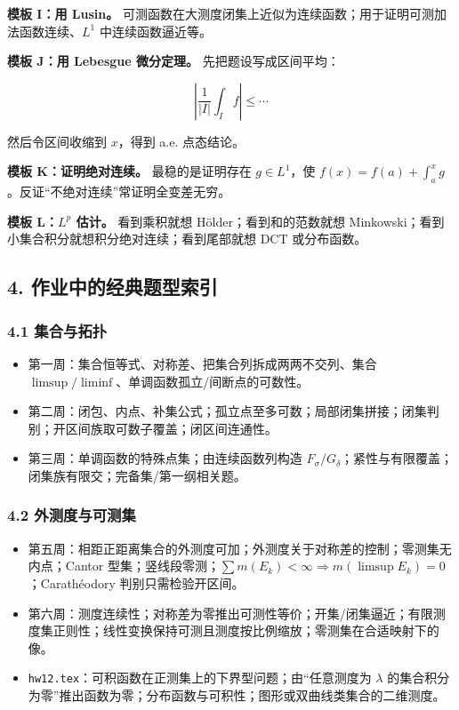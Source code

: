\documentclass[
UTF8]{ctexart}
\providecommand{\tightlist}{%
\setlength{\itemsep}{0pt}\setlength{\parskip}{0pt}}
\begin{document}
\textbf{模板 I：用 Lusin。}
可测函数在大测度闭集上近似为连续函数；用于证明可测加法函数连续、\(L^1\)
中连续函数逼近等。

\textbf{模板 J：用 Lebesgue 微分定理。} 先把题设写成区间平均：

\[
  \left|\frac1{|I|}\int_I f\right|\le \cdots
\]

然后令区间收缩到 \(x\)，得到 a.e. 点态结论。

\textbf{模板 K：证明绝对连续。} 最稳的是证明存在 \(g\in L^1\)，使
\(f(x)=f(a)+\int_a^x g\)。反证``不绝对连续''常证明全变差无穷。

\textbf{模板 L：\(L^p\) 估计。} 看到乘积就想 Hölder；看到和的范数就想
Minkowski；看到小集合积分就想积分绝对连续；看到尾部就想 DCT 或分布函数。

\subsection{4.
作业中的经典题型索引}\label{ux4f5cux4e1aux4e2dux7684ux7ecfux5178ux9898ux578bux7d22ux5f15}

\subsubsection{4.1 集合与拓扑}\label{ux96c6ux5408ux4e0eux62d3ux6251}

\begin{itemize}
    \tightlist
  \item
    第一周：集合恒等式、对称差、把集合列拆成两两不交列、集合
    \(\limsup/\liminf\)、单调函数孤立/间断点的可数性。
  \item
    第二周：闭包、内点、补集公式；孤立点至多可数；局部闭集拼接；闭集判别；开区间族取可数子覆盖；闭区间连通性。
  \item
    第三周：单调函数的特殊点集；由连续函数列构造
    \(F_\sigma/G_\delta\)；紧性与有限覆盖；闭集族有限交；完备集/第一纲相关题。
\end{itemize}

\subsubsection{4.2
外测度与可测集}\label{ux5916ux6d4bux5ea6ux4e0eux53efux6d4bux96c6}

\begin{itemize}
    \tightlist
  \item
    第五周：相距正距离集合的外测度可加；外测度关于对称差的控制；零测集无内点；Cantor
    型集；竖线段零测；\(\sum m(E_k)<\infty\Rightarrow m(\limsup E_k)=0\)；Carathéodory
    判别只需检验开区间。
  \item
    第六周：测度连续性；对称差为零推出可测性等价；开集/闭集逼近；有限测度集正则性；线性变换保持可测且测度按比例缩放；零测集在合适映射下的像。
  \item
    \texttt{hw12.tex}：可积函数在正测集上的下界型问题；由``任意测度为
    \(\lambda\)
    的集合积分为零''推出函数为零；分布函数与可积性；图形或双曲线类集合的二维测度。
\end{itemize}
\end{document}
